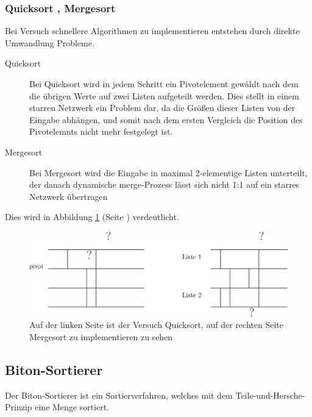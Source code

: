 \documentclass[11pt]{article}
\begin{document}
\subsubsection{Quicksort , Mergesort}
Bei Versuch schnellere Algorithmen zu implementieren entstehen durch direkte Umwandlung Probleme. 
\begin{description}
\item[Quicksort] Bei Quicksort wird in jedem Schritt ein Pivotelement gewählt nach dem die übrigen Werte auf zwei Listen aufgeteilt werden. Dies stellt in einem starren Netzwerk ein Problem dar, da die Größen dieser Listen von der Eingabe abhängen, und somit nach dem ersten Vergleich die Position des Pivotelemnts nicht mehr festgelegt ist. 
\item[Mergesort] Bei Mergesort wird die Eingabe in maximal 2-elementige Listen unterteilt, der danach dynamische merge-Prozess lässt sich nicht 1:1 auf ein starres Netzwerk übertragen
\end{description}
Dies wird in Abbildung \ref{fig:mergesort} (Seite \pageref{fig:mergesort}) verdeutlicht.
\begin{figure}
\begin{center}
\includegraphics[scale=0.8]{mergesort.eps}
\end{center}
\caption{Auf der linken Seite ist der Versuch Quicksort, auf der rechten Seite Mergesort zu implementieren zu sehen}
\label{fig:mergesort}
\end{figure}
\subsection{Biton-Sortierer}
Der Biton-Sortierer ist ein Sortierverfahren, welches mit dem Teile-und-Hersche-Prinzip eine Menge sortiert.
\end{document}
